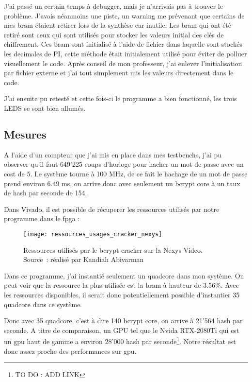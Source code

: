 J'ai passé un certain temps à debugger, mais je n'arrivais pas à trouver le problème. 
J'avais néanmoins une piste, un warning me prévenant que certains de mes \gls{bram} étaient retirer lors de la synthèse car inutile. 
Les \gls{bram} qui ont été retiré sont ceux qui sont utilisés pour stocker les valeurs initial des clés de chiffrement.
Ces \gls{bram} sont initialisé à l'aide de fichier dans laquelle sont stockés les decimales de PI, cette méthode était initialement utilisé pour éviter de polluer visuellement le code.
Après conseil de mon professeur, j'ai enlever l'initialisation par fichier externe et j'ai tout simplement mis les valeurs directement dans le code.

J'ai ensuite pu retesté et cette fois-ci le programme a bien fonctionné, les trois LEDS se sont bien allumés.

\newpage

\subsection{Mesures}

A l'aide d'un compteur que j'ai mis en place dans mes testbenchs, j'ai pu observer qu'il faut 649'225 coups d'horloge pour hacher un mot de passe avec un cost de 5.
Le système tourne à 100 MHz, de ce fait le hachage de un mot de passe prend environ 6.49 ms, on arrive donc avec seulement un bcrypt core à un taux de hash par seconde de 154.

Dans Vivado, il est possible de récuperer les ressources utilisés par notre programme dans le \gls{fpga} : 

\begin{figure}[tbph!]
	\centering
	\texttt{[image: ressources\_usages\_cracker\_nexys]}
	\caption[Ressources utilisés par le bcrypt cracker sur la Nexys Video]{Ressources utilisés par le bcrypt cracker sur la Nexys Video. Source : réalisé par Kandiah Abivarman}
	\label{fig:ressources_usages_cracker_nexys}
\end{figure}

Dans ce programme, j'ai instantié seulement un quadcore dans mon système. On peut voir que la ressource la plus utilisée est la \gls{bram} à hauteur de 3.56\%. 
Avec les ressources disponibles, il serait donc potentiellement possible d'instantier 35 quadcore dans ce système.

Donc avec 35 quadcore, c'est à dire 140 bcrypt core, on arrive à 21'564 hash par seconde. 
A titre de comparaison, un GPU tel que le Nvida RTX-2080Ti qui est un \gls{gpu} haut de gamme a environ 28'000 hash par seconde\footnote{TO DO : ADD LINK}.
Notre résultat est donc assez proche des performances sur \gls{gpu}.

